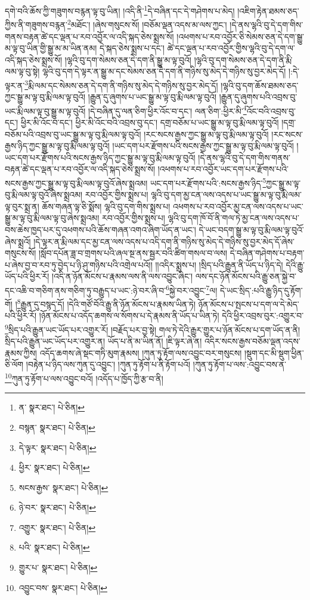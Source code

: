 དགེ་བའི་ཆོས་ཀྱི་གཟུགས་བརྙན་ལྟ་བུ་ཡིན། །འདི་ནི་\footnote{ན་  སྣར་ཐང་།  པེ་ཅིན། }དེ་བཞིན་དང་དེ་གཤེགས་པ་མེད། །འཇིག་རྟེན་ཐམས་ཅད་ཀྱིས་ནི་གཟུགས་བརྙན་\footnote{བསྙན་  སྣར་ཐང་།  པེ་ཅིན། }མཐོང་། །ཞེས་གསུངས་སོ། །བཅོམ་ལྡན་འདས་མ་ལས་ཀྱང་། །དེ་ནས་ལྷའི་བུ་དེ་དག་གིས་གནས་བརྟན་ཚེ་དང་ལྡན་པ་རབ་འབྱོར་ལ་འདི་སྐད་ཅེས་སྨྲས་སོ། །འཕགས་པ་རབ་འབྱོར་ཅི་སེམས་ཅན་དེ་དག་སྒྱུ་མ་ལྟ་བུ་ཡིན་གྱི་སྒྱུ་མ་མ་ཡིན་ནམ། དེ་སྐད་ཅེས་སྨྲས་པ་དང་། ཚེ་དང་ལྡན་པ་རབ་འབྱོར་གྱིས་ལྷའི་བུ་དེ་དག་ལ་འདི་སྐད་ཅེས་སྨྲས་སོ། །ལྷའི་བུ་དག་སེམས་ཅན་དེ་དག་ནི་སྒྱུ་མ་ལྟ་བུའོ། །ལྷའི་བུ་དག་སེམས་ཅན་དེ་དག་ནི་རྨི་ལམ་ལྟ་བུ་སྟེ། ལྷའི་བུ་དག་དེ་ལྟར་ན་སྒྱུ་མ་དང་སེམས་ཅན་དེ་དག་ནི་གཉིས་སུ་མེད་དེ་གཉིས་སུ་བྱར་མེད་དོ། །:དེ་ལྟར་ན་\footnote{དེ་ལྟར་  སྣར་ཐང་།  པེ་ཅིན། }རྨི་ལམ་དང་སེམས་ཅན་དེ་དག་ནི་གཉིས་སུ་མེད་དེ་གཉིས་སུ་བྱར་མེད་དོ། །ལྷའི་བུ་དག་ཆོས་ཐམས་ཅད་ཀྱང་སྒྱུ་མ་ལྟ་བུ་རྨི་ལམ་ལྟ་བུའོ། །རྒྱུན་དུ་ཞུགས་པ་ཡང་སྒྱུ་མ་ལྟ་བུ་རྨི་ལམ་ལྟ་བུའོ། །རྒྱུན་དུ་ཞུགས་པའི་འབྲས་བུ་ཡང་རྨི་ལམ་ལྟ་བུ་སྒྱུ་མ་ལྟ་བུའོ། །དེ་བཞིན་དུ་ལན་ཅིག་ཕྱིར་འོང་བ་དང་། ལན་ཅིག་:ཕྱིར་མི་\footnote{ཕྱིར་  སྣར་ཐང་།  པེ་ཅིན། }འོང་བའི་འབྲས་བུ་དང་། ཕྱིར་མི་འོང་བ་དང་། ཕྱིར་མི་འོང་བའི་འབྲས་བུ་དང་། དགྲ་བཅོམ་པ་ཡང་སྒྱུ་མ་ལྟ་བུ་རྨི་ལམ་ལྟ་བུའོ། །དགྲ་བཅོམ་པའི་འབྲས་བུ་ཡང་སྒྱུ་མ་ལྟ་བུ་རྨི་ལམ་ལྟ་བུའོ། །རང་སངས་རྒྱས་ཀྱང་སྒྱུ་མ་ལྟ་བུ་རྨི་ལམ་ལྟ་བུའོ། །རང་སངས་རྒྱས་ཉིད་ཀྱང་སྒྱུ་མ་ལྟ་བུ་རྨི་ལམ་ལྟ་བུའོ། །ཡང་དག་པར་རྫོགས་པའི་སངས་རྒྱས་ཀྱང་སྒྱུ་མ་ལྟ་བུ་རྨི་ལམ་ལྟ་བུའོ། །ཡང་དག་པར་རྫོགས་པའི་སངས་རྒྱས་ཉིད་ཀྱང་སྒྱུ་མ་ལྟ་བུ་རྨི་ལམ་ལྟ་བུའོ། །དེ་ནས་ལྷའི་བུ་དེ་དག་གིས་གནས་བརྟན་ཚེ་དང་ལྡན་པ་རབ་འབྱོར་ལ་འདི་སྐད་ཅེས་སྨྲས་སོ། །འཕགས་པ་རབ་འབྱོར་ཡང་དག་པར་རྫོགས་པའི་སངས་རྒྱས་ཀྱང་སྒྱུ་མ་ལྟ་བུ་རྨི་ལམ་ལྟ་བུའོ་ཞེས་སྨྲའམ། ཡང་དག་པར་རྫོགས་པའི་:སངས་རྒྱས་ཉིད་\footnote{སངས་རྒྱས་  སྣར་ཐང་།  པེ་ཅིན། }ཀྱང་སྒྱུ་མ་ལྟ་བུ་རྨི་ལམ་ལྟ་བུའོ་ཞེས་སྨྲའམ། རབ་འབྱོར་གྱིས་སྨྲས་པ། ལྷའི་བུ་དག་མྱ་ངན་ལས་འདས་པ་ཡང་སྒྱུ་མ་ལྟ་བུ་རྨི་ལམ་ལྟ་བུར་སྨྲ་ན། ཆོས་གཞན་ལྟ་ཅི་སྨོས། ལྷའི་བུ་དག་གིས་སྨྲས་པ། འཕགས་པ་རབ་འབྱོར་མྱ་ངན་ལས་འདས་པ་ཡང་སྒྱུ་མ་ལྟ་བུ་རྨི་ལམ་ལྟ་བུ་ཞེས་སྨྲའམ། རབ་འབྱོར་གྱིས་སྨྲས་པ། ལྷའི་བུ་དག་ཁོ་བོ་ནི་གལ་ཏེ་མྱ་ངན་ལས་འདས་པ་བས་ཆེས་ཁྱད་པར་དུ་འཕགས་པའི་ཆོས་གཞན་འགའ་ཞིག་ཡོད་ན་ཡང་། དེ་ཡང་བདག་སྒྱུ་མ་ལྟ་བུ་རྨི་ལམ་ལྟ་བུའོ་ཞེས་སྨྲའོ། །དེ་ལྟར་ན་རྨི་ལམ་དང་མྱ་ངན་ལས་འདས་པ་འདི་དག་ནི་གཉིས་སུ་མེད་དེ་གཉིས་སུ་བྱར་མེད་དོ་ཞེས་གསུངས་སོ། །སློབ་དཔོན་ཟླ་བ་གྲགས་པའི་ཞལ་སྔ་ནས་སྦྱར་བའི་ཚིག་གསལ་བ་ལས། དེ་བཞིན་གཤེགས་པ་བརྟག་པ་ཞེས་བྱ་བ་རབ་ཏུ་བྱེད་པ་ཉི་ཤུ་གཉིས་པའི་འགྲེལ་པའོ།། །།འདིར་སྨྲས་པ། །སྲིད་པའི་རྒྱུན་ནི་ཡོད་པ་ཉིད་དེ། དེའི་རྒྱུ་ཡོད་པའི་ཕྱིར་རོ། །འདི་ན་ཉོན་མོངས་པ་རྣམས་ལས་ནི་ལས་འབྱུང་ཞིང་། ལས་དང་ཉོན་མོངས་པའི་རྒྱུ་ཅན་སྐྱེ་བ་དང་འཆི་བ་གཅིག་ནས་གཅིག་ཏུ་བརྒྱུད་པ་ཡང་:ཉེ་བར་ཞི་བ་\footnote{ཉེ་བར་  སྣར་ཐང་།  པེ་ཅིན། }སྐྱེ་བར་འབྱུང་\footnote{འགྱུར་  སྣར་ཐང་།  པེ་ཅིན། }ལ། དེ་ཡང་སྲིད་:པའི་རྒྱུ་ཉིད་དུ་རྟོག་གོ། །\footnote{པའི་  སྣར་ཐང་།  པེ་ཅིན། }རྒྱུན་དུ་བསྙད་དོ། །དེའི་གཙོ་བོའི་རྒྱུ་ནི་ཉོན་མོངས་པ་རྣམས་ཡིན་ཏེ། ཉོན་མོངས་པ་སྤངས་པ་དག་ལ་དེ་མེད་པའི་ཕྱིར་རོ། །ཉོན་མོངས་པ་འདོད་ཆགས་ལ་སོགས་པ་དེ་རྣམས་ནི་ཡོད་པ་ཡིན་ཏེ། དེའི་ཕྱིར་འབྲས་བུར་:འགྱུར་བ་\footnote{གྱུར་པ་  སྣར་ཐང་།  པེ་ཅིན། }སྲིད་པའི་རྒྱུན་ཡང་ཡོད་པར་འགྱུར་རོ། །བརྗོད་པར་བྱ་སྟེ། གལ་ཏེ་དེའི་རྒྱུར་གྱུར་པ་ཉོན་མོངས་པ་དག་ཡོད་ན་ནི། སྲིད་པའི་རྒྱུན་ཡང་ཡོད་པར་འགྱུར་ན། ཡོད་པ་ནི་མ་ཡིན་ནོ། །ཇི་ལྟར་ཞེ་ན། འདིར་སངས་རྒྱས་བཅོམ་ལྡན་འདས་རྣམས་ཀྱིས། འདོད་ཆགས་ཞེ་སྡང་གཏི་མུག་རྣམས། །ཀུན་ཏུ་རྟོག་ལས་འབྱུང་བར་གསུངས། །སྡུག་དང་མི་སྡུག་ཕྱིན་ཅི་ལོག །བརྟེན་པ་ཉིད་ལས་ཀུན་དུ་འབྱུང་། །ཀུན་ཏུ་རྟོག་པ་ནི་རྟོག་པའོ། །ཀུན་ཏུ་རྟོག་པ་ལས་:འབྱུང་བས་ན་\footnote{འབྱུང་བས་  སྣར་ཐང་།  པེ་ཅིན། }ཀུན་ཏུ་རྟོག་པ་ལས་འབྱུང་བའོ། །འདོད་པ་ཁྱོད་ཀྱི་རྩ་བ་ནི། 
